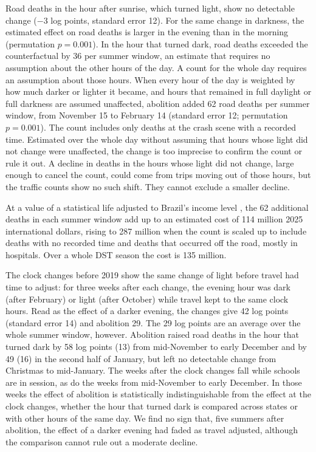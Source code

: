Road deaths in the hour after sunrise, which turned light, show no detectable change ($-3$ log points, standard error 12). For the same change in darkness, the estimated effect on road deaths is larger in the evening than in the morning (permutation $p=0.001$). In the hour that turned dark, road deaths exceeded the counterfactual by 36 per summer window, an estimate that requires no assumption about the other hours of the day. A count for the whole day requires an assumption about those hours. When every hour of the day is weighted by how much darker or lighter it became, and hours that remained in full daylight or full darkness are assumed unaffected, abolition added 62 road deaths per summer window, from November 15 to February 14 (standard error 12; permutation $p=0.001$). The count includes only deaths at the crash scene with a recorded time. Estimated over the whole day without assuming that hours whose light did not change were unaffected, the change is too imprecise to confirm the count or rule it out. A decline in deaths in the hours whose light did not change, large enough to cancel the count, could come from trips moving out of those hours, but the traffic counts show no such shift. They cannot exclude a smaller decline.

At a value of a statistical life adjusted to Brazil's income level \citep{robinson2019valuing}, the 62 additional deaths in each summer window add up to an estimated cost of 114 million 2025 international dollars, rising to 287 million when the count is scaled up to include deaths with no recorded time and deaths that occurred off the road, mostly in hospitals. Over a whole DST season the cost is 135 million.

The clock changes before 2019 show the same change of light before travel had time to adjust: for three weeks after each change, the evening hour was dark (after February) or light (after October) while travel kept to the same clock hours. Read as the effect of a darker evening, the changes give 42 log points (standard error 14) and abolition 29. The 29 log points are an average over the whole summer window, however. Abolition raised road deaths in the hour that turned dark by 58 log points (13) from mid-November to early December and by 49 (16) in the second half of January, but left no detectable change from Christmas to mid-January. The weeks after the clock changes fall while schools are in session, as do the weeks from mid-November to early December. In those weeks the effect of abolition is statistically indistinguishable from the effect at the clock changes, whether the hour that turned dark is compared across states or with other hours of the same day. We find no sign that, five summers after abolition, the effect of a darker evening had faded as travel adjusted, although the comparison cannot rule out a moderate decline.

